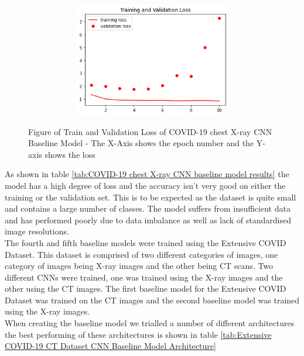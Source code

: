  \begin{figure}[H]
    \centering
\includegraphics[width=1\textwidth,height=5cm,keepaspectratio]{Images/ChestXrayCNNBaselineTrainAndValLoss.png}\\
    \caption{Figure of Train and Validation Loss of COVID-19 chest X-ray CNN Baseline Model - The X-Axis shows the epoch number and the Y-axis shows the loss}
    \label{fig:COVID-19 chest X-ray CNN Baseline Train and Validation Loss}
\end{figure}
As shown in table \ref{tab:COVID-19 chest X-ray CNN baseline model results} the model has a high degree of loss and the accuracy isn't very good on either the training or the validation set.  This is to be expected as the dataset is quite small and contains a large number of classes.  The model suffers from insufficient data and has performed poorly due to data imbalance as well as lack of standardised image resolutions.
\\
The fourth and fifth baseline models were trained using the Extensive COVID Dataset.  This dataset is comprised of two different categories of images, one category of images being X-ray images and the other being CT scans.  Two different CNNs were trained, one was trained using the X-ray images and the other using the CT images.  The first baseline model for the Extensive COVID Dataset was trained on the CT images and the second baseline model was trained using the X-ray images.
\\
When creating the baseline model we trialled a number of different architectures the best performing of these architectures is shown in table \ref{tab:Extensive COVID-19 CT Dataset CNN Baseline Model Architecture}
